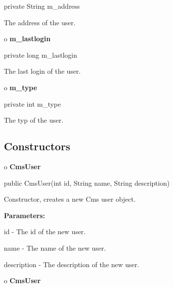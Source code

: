 \begin{PRE}
 private String m\_address
\end{PRE}

\begin{description}
\htmlDD The address of the user.

\end{description}

o {\bf m\_lastlogin} 

\begin{PRE}
 private long m\_lastlogin
\end{PRE}

\begin{description}
\htmlDD The last login of the user.

\end{description}

o {\bf m\_type} 

\begin{PRE}
 private int m\_type
\end{PRE}

\begin{description}
\htmlDD The typ of the user.

\end{description}

\subsection*{  Constructors }

o {\bf CmsUser} 

\begin{PRE}
 public CmsUser(int id,
                String name,
                String description)
\end{PRE}

\begin{description}
\htmlDD Constructor, creates a new Cms user object. 

\begin{description}
\item {\bf Parameters:}  

id - The id of the new user.  

name - The name of the new user.  

description - The description of the new user.  
\end{description}

\end{description}

o {\bf CmsUser} 

